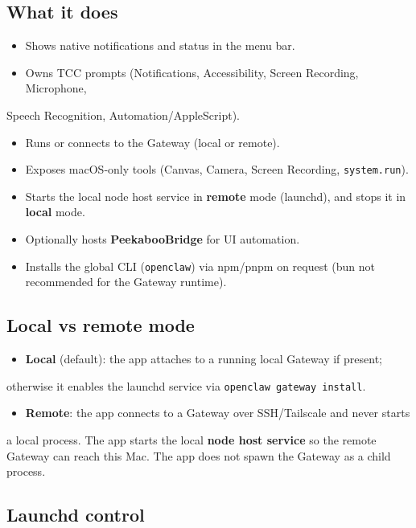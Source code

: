 \subsection{What it does}


\begin{itemize}
  \item Shows native notifications and status in the menu bar.
  \item Owns TCC prompts (Notifications, Accessibility, Screen Recording, Microphone,
\end{itemize}

Speech Recognition, Automation/AppleScript).
\begin{itemize}
  \item Runs or connects to the Gateway (local or remote).
  \item Exposes macOS‑only tools (Canvas, Camera, Screen Recording, \texttt{system.run}).
  \item Starts the local node host service in \textbf{remote} mode (launchd), and stops it in \textbf{local} mode.
  \item Optionally hosts \textbf{PeekabooBridge} for UI automation.
  \item Installs the global CLI (\texttt{openclaw}) via npm/pnpm on request (bun not recommended for the Gateway runtime).
\end{itemize}


\subsection{Local vs remote mode}


\begin{itemize}
  \item \textbf{Local} (default): the app attaches to a running local Gateway if present;
\end{itemize}

otherwise it enables the launchd service via \texttt{openclaw gateway install}.
\begin{itemize}
  \item \textbf{Remote}: the app connects to a Gateway over SSH/Tailscale and never starts
\end{itemize}

a local process.
The app starts the local \textbf{node host service} so the remote Gateway can reach this Mac.
The app does not spawn the Gateway as a child process.

\subsection{Launchd control}


